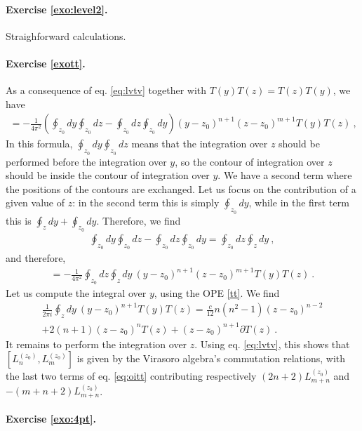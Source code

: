 \documentclass[12pt, a4paper]{article}
\theoremstyle{break}
\begin{document}
\paragraph{Exercise \ref{exo:level2}.} 

Straighforward calculations.

\paragraph{Exercise \ref{exott}.} 

As a consequence of eq. \eqref{eq:lvtv} together with $T(y)T(z)=T(z)T(y)$, we have 
\begin{align}
 [L_n^{(z_0)},L_m^{(z_0)}] = -\frac{1}{4\pi^2} \left(\oint_{z_0} dy \oint_{z_0} dz - \oint_{z_0} dz \oint_{z_0} dy\right) (y-z_0)^{n+1}(z-z_0)^{m+1} T(y)T(z)\ ,
 \label{lzlz}
\end{align}
In this formula, $\oint_{z_0} dy \oint_{z_0} dz$ means that the integration over $z$ should be performed before the integration over $y$, so the contour of integration over $z$ should be inside the contour of integration over $y$. We have a second term where the positions of the contours are exchanged. Let us focus on the contribution of a given value of $z$: in the second term this is simply $\oint_{z_0} dy$, while in the first term this is $\oint_{z} dy + \oint_{z_0} dy$.
Therefore, we find
\begin{align}
 \oint_{z_0} dy \oint_{z_0} dz - \oint_{z_0} dz \oint_{z_0} dy = \oint_{z_0} dz \oint_z dy\ ,
\end{align}
and therefore,
\begin{align}
 [L_n^{(z_0)},L_m^{(z_0)}] = -\frac{1}{4\pi^2} \oint_{z_0} dz \oint_{z} dy\  (y-z_0)^{n+1}(z-z_0)^{m+1} T(y)T(z)\ .
\end{align}
Let us compute the integral over $y$, using the OPE \eqref{tt}. We find 
\begin{multline}
 \frac{1}{2\pi i} \oint_z dy\ (y-z_0)^{n+1} T(y)T(z) = \frac{c}{12} n(n^2-1) (z-z_0)^{n-2} 
 \\
 +2(n+1)(z-z_0)^n T(z) + (z-z_0)^{n+1} \partial T(z)\ .
 \label{eq:oitt}
\end{multline}
It remains to perform the integration over $z$. Using eq. \eqref{eq:lvtv}, this shows that $[L_n^{(z_0)},L_m^{(z_0)}]$ is given by the Virasoro algebra's commutation relations, with the last two terms of eq. \eqref{eq:oitt} contributing respectively $(2n+2)L_{m+n}^{(z_0)}$ and $-(m+n+2)L_{m+n}^{(z_0)}$.

\paragraph{Exercise \ref{exo:4pt}.} 
\end{document}
